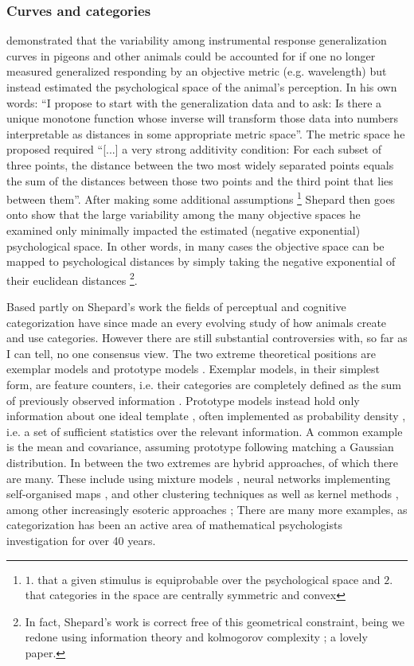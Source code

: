 \documentclass[doc,12pt]{apa}        %
\begin{document}
\subsubsection{Curves and categories}
 demonstrated that the variability among instrumental response generalization curves in pigeons and other animals could be accounted for if one no longer measured generalized responding by an objective metric (e.g. wavelength) but instead estimated the psychological space of the animal's perception.  In his own words: ``I propose to start with the generalization data and to ask: Is there a unique monotone function whose inverse will transform those data into numbers interpretable as distances in some appropriate metric space''. The metric space he proposed required ``[...] a very strong additivity condition: For each subset of three points, the distance between the two most widely separated points equals the sum of the distances between those two points and the third point that lies between them''.  After making some additional assumptions
\footnote{
    $1.$ that a given stimulus is equiprobable over the psychological space and $2.$ that categories in the space are centrally symmetric and convex
} Shepard then goes onto show that the large variability among the many objective spaces he examined only minimally impacted the estimated (negative exponential) psychological space.  In other words, in many cases the objective space can be mapped to psychological distances by simply taking the negative exponential of their euclidean distances
\footnote{
    In fact, Shepard's work is correct free of this geometrical constraint, being we redone using information theory and kolmogorov complexity \cite{Chatera:2003p9103}; a lovely paper.}.

Based partly on Shepard's work the fields of perceptual and cognitive categorization have since made an every evolving study of how animals create and use categories.  However there are still substantial controversies with, so far as I can tell, no one consensus view.  The two extreme theoretical positions are exemplar models and prototype models \cite{Ashby:2005p4764}.  Exemplar models, in their simplest form, are feature counters, i.e. their categories are completely defined as the sum of previously observed information \cite{Nosofsky:1988p9104}.  Prototype models instead hold only information about one ideal template \cite{Rosch:1973p9108}, often implemented as probability density \cite{Ashby:1995p9109}, i.e. a set of sufficient statistics over the relevant information.  A common example is the mean and covariance, assuming prototype following matching a Gaussian distribution.  In between the two extremes are hybrid approaches, of which there are many.  These include using mixture models \cite{Rossee:2002p9112}, neural networks implementing self-organised maps \cite{Love:2004p9110}, and other clustering techniques \cite{Kruschke:2012p9111} as well as kernel methods \cite{Jakel:2008p9113}, among other increasingly esoteric approaches \cite{Martin:2012p9185}; There are many more examples, as categorization has been an active area of mathematical psychologists investigation for over 40 years.
\end{document}
